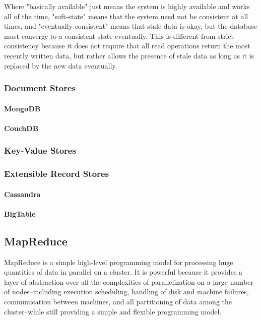 \documentclass[11pt,a4paper]{report}
\begin{document}
Where "basically available" just means the system is highly available and works all of the time, "soft-state" means that the system need not be consistent at all times, and "eventually consistent" means that stale data is okay, but the database must converge to a consistent state eventually.\cite{brewer2000towards, strauch2011nosql} This is different from strict consistency because it does not require that all read operations return the most recently written data, but rather allows the presence of stale data as long as it is replaced by the new data eventually.

\subsubsection*{Document Stores}
\paragraph*{MongoDB}
\paragraph*{CouchDB}
\subsubsection*{Key-Value Stores}
\subsubsection*{Extensible Record Stores}
\paragraph*{Cassandra}
\paragraph*{BigTable}

\subsection*{MapReduce}
MapReduce is a simple high-level programming model for processing huge quantities of data in parallel on a cluster. It is powerful because it provides a layer of abstraction over all the complexities of parallelization on a large number of nodes--including  execution scheduling, handling of disk and machine failures, communication between machines, and all partitioning of data among the cluster--while still providing a simple and flexible programming model.\cite{dean2008mapreduce}
\end{document}
